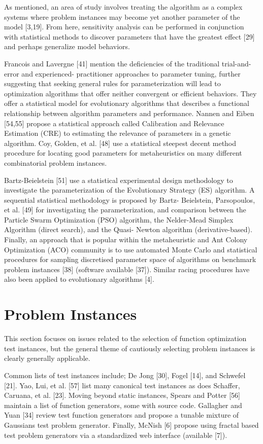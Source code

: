 \documentclass[a4paper, 11pt]{article}
\begin{document}
As mentioned, an area of study involves treating the algorithm as a complex systems where problem instances may become yet another parameter of the model [3,19]. From here, sensitivity analysis can be performed in conjunction with statistical methods to discover parameters that have the greatest effect [29] and perhaps generalize model behaviors.

Francois and Lavergne [41] mention the deficiencies of the traditional trial-and-error and experienced- practitioner approaches to parameter tuning, further suggesting	that	seeking	general	rules	for parameterization will lead to optimization algorithms that offer neither convergent or efficient behaviors. They offer a statistical model for evolutionary algorithms that describes a functional relationship between algorithm parameters and performance. Nannen and Eiben [54,55] propose a statistical approach called Calibration and Relevance Estimation (CRE) to estimating the relevance of parameters in a genetic algorithm. Coy, Golden, et al. [48] use a statistical steepest decent method procedure for locating good parameters for metaheuristics on many different combinatorial problem instances.

Bartz-Beielstein [51] use a statistical experimental design methodology to investigate the parameterization of the Evolutionary Strategy (ES) algorithm. A sequential statistical methodology is proposed by Bartz- Beielstein, Parsopoulos, et al. [49] for investigating the parameterization, and comparison between the Particle Swarm Optimization (PSO) algorithm, the Nelder-Mead Simplex Algorithm (direct search), and the Quasi- Newton algorithm (derivative-based). Finally, an approach that is popular within the metaheuristic and Ant Colony Optimization (ACO) community is to use automated Monte Carlo and statistical procedures for sampling discretised parameter space of algorithms on benchmark problem instances [38] (software available [37]). Similar racing procedures have also been applied to evolutionary algorithms [4].

% 
% 
\section{Problem Instances}
This section focuses on issues related to the selection of function optimization test instances, but the general theme of cautiously selecting problem instances is clearly generally applicable.

Common lists of test instances include; De Jong [30], Fogel [14], and Schwefel [21]. Yao, Lui, et al. [57] list many canonical test instances as does Schaffer, Caruana, et al. [23]. Moving beyond static instances, Spears and Potter [56] maintain a list of function generators, some with source code. Gallagher and Yuan [34] review test function generators and propose a tunable mixture of Gaussians test problem generator. Finally, McNish [6] propose using fractal based test problem generators via a standardized web interface (available [7]).
\end{document}

